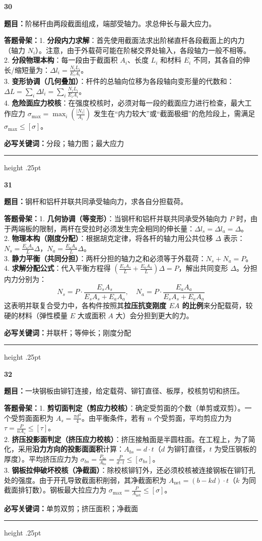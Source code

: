 \documentclass[a4paper,10pt]{article}
\newcommand{\qitem}[5]{%
\Needspace{6\baselineskip}
\vspace{3pt}
{\Large\bfseries\color{deep} #1}\quad{\bfseries\color{orangea}#2}\par
\textbf{题目：}#3\par
\textbf{答题骨架：}#4\par
\textbf{必写关键词：}{\color{bluea}#5}\par
\vspace{2pt}\hrule height .25pt
}
\begin{document}
\qitem{30}{阶梯杆受轴力}
{阶梯杆由两段截面组成，端部受轴力。求总伸长与最大应力。}
{1. \textbf{分段内力求解}：首先使用截面法求出阶梯直杆各段截面上的内力（轴力 \(N_i\)）。注意，由于外载荷可能在阶梯交界处输入，各段轴力一般不相等。\\
2. \textbf{分段物理本构}：每一段由于截面积 \(A_i\)、长度 \(L_i\) 和材料 \(E_i\) 不同，其各自的伸长/缩短量为：\(\Delta l_i = \frac{N_i L_i}{E_i A_i}\)。\\
3. \textbf{变形协调（几何叠加）}：杆件的总轴向位移为各段轴向变形量的代数和：\(\Delta L = \sum_i \Delta l_i = \sum_i \frac{N_i L_i}{E_i A_i}\)。\\
4. \textbf{危险面应力校核}：在强度校核时，必须对每一段的截面应力进行检查，最大工作应力 \(\sigma_{\max} = \max_i \left( \frac{|N_i|}{A_i} \right)\) 发生在“内力较大”或“截面极细”的危险段上，需满足 \(\sigma_{\max} \le [\sigma]\)。}
{分段；轴力图；最大应力}

\qitem{31}{复合杆同伸长}
{钢杆和铝杆并联共同承受轴向力，求各自分担载荷。}
{1. \textbf{几何协调（等变形）}：当钢杆和铝杆并联共同承受外轴向力 \(P\) 时，由于两端板的限制，两杆在受拉时必须发生完全相同的伸长量：\(\Delta l_s = \Delta l_a = \Delta\)。\\
2. \textbf{物理本构（刚度分配）}：根据胡克定律，将各杆的轴力用公共位移 \(\Delta\) 表示：\(N_s = \frac{E_s A_s}{L}\Delta\)，\(N_a = \frac{E_a A_a}{L}\Delta\)。\\
3. \textbf{静力平衡（共同分担）}：两杆分担的轴力之和必须等于外载荷：\(N_s + N_a = P\)。\\
4. \textbf{求解分配公式}：代入平衡方程得 \(\left( \frac{E_s A_s}{L} + \frac{E_a A_a}{L} \right) \Delta = P\)，解出共同变形 \(\Delta\)。分担内力分别为：
   \[ N_s = P \cdot \frac{E_s A_s}{E_s A_s + E_a A_a}, \quad N_a = P \cdot \frac{E_a A_a}{E_s A_s + E_a A_a} \]
   这表明并联复合受力中，各构件按照其\textbf{拉压抗变刚度 \(EA\) 的比例}来分配载荷，较硬的材料（弹性模量 \(E\) 大或面积 \(A\) 大）会分担到更大的力。}
{并联杆；等伸长；刚度分配}

\qitem{32}{铆钉连接校核}
{一块钢板由铆钉连接，给定载荷、铆钉直径、板厚，校核剪切和挤压。}
{1. \textbf{剪切面判定（剪应力校核）}：确定受剪面的个数（单剪或双剪）。一个受剪面面积为 \(A_s = \frac{\pi d^2}{4}\)。由平衡条件，若有 \(n\) 个受剪面，平均剪应力为 \(\tau = \frac{P}{n A_s} \le [\tau]\)。\\
2. \textbf{挤压投影面判定（挤压应力校核）}：挤压接触面是半圆柱面。在工程上，为了简化，采用\textbf{沿力方向的投影面面积}计算：\(A_{bs} = d \cdot t\)（\(d\) 为铆钉直径，\(t\) 为受压钢板的厚度）。平均挤压应力为 \(\sigma_{bs} = \frac{P_{bs}}{A_{bs}} = \frac{P}{d \cdot t} \le [\sigma_{bs}]\)。\\
3. \textbf{钢板拉伸破坏校核（净截面）}：除校核铆钉外，还必须校核被连接钢板在铆钉孔处的强度。由于开孔导致截面积削弱，其净截面积为 \(A_{\text{net}} = (b - k d) \cdot t\)（\(k\) 为同截面排钉数）。钢板最大拉应力为 \(\sigma_{\max} = \frac{P}{A_{\text{net}}} \le [\sigma]\)。}
{单剪双剪；挤压面积；净截面}
\end{document}
